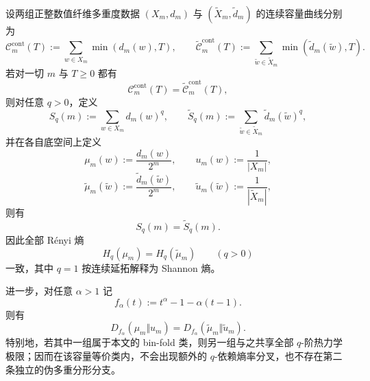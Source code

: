 \begin{theorem}[容量等价类的热力学刚性]\label{thm:conclusion-capacity-equivalence-thermodynamic-rigidity}
设两组正整数值纤维多重度数据 \((X_m,d_m)\) 与 \((\widetilde X_m,\widetilde d_m)\) 的连续容量曲线分别为
\[
\mathcal C_m^{\mathrm{cont}}(T):=\sum_{w\in X_m}\min(d_m(w),T),
\qquad
\widetilde{\mathcal C}_m^{\mathrm{cont}}(T):=\sum_{\widetilde w\in \widetilde X_m}\min(\widetilde d_m(\widetilde w),T).
\]
若对一切 \(m\) 与 \(T\ge 0\) 都有
\[
\mathcal C_m^{\mathrm{cont}}(T)=\widetilde{\mathcal C}_m^{\mathrm{cont}}(T),
\]
则对任意 \(q>0\)，定义
\[
S_q(m):=\sum_{w\in X_m}d_m(w)^q,
\qquad
\widetilde S_q(m):=\sum_{\widetilde w\in \widetilde X_m}\widetilde d_m(\widetilde w)^q,
\]
并在各自底空间上定义
\[
\mu_m(w):=\frac{d_m(w)}{2^m},
\qquad
u_m(w):=\frac{1}{|X_m|},
\]
\[
\widetilde\mu_m(\widetilde w):=\frac{\widetilde d_m(\widetilde w)}{2^m},
\qquad
\widetilde u_m(\widetilde w):=\frac{1}{|\widetilde X_m|},
\]
则有
\[
S_q(m)=\widetilde S_q(m).
\]
因此全部 Rényi 熵
\[
H_q(\mu_m)=H_q(\widetilde\mu_m)
\qquad(q>0)
\]
一致，其中 \(q=1\) 按连续延拓解释为 Shannon 熵。

进一步，对任意 \(\alpha>1\) 记
\[
f_\alpha(t):=t^\alpha-1-\alpha(t-1).
\]
则有
\[
D_{f_\alpha}(\mu_m\Vert u_m)
=
D_{f_\alpha}(\widetilde\mu_m\Vert \widetilde u_m).
\]
特别地，若其中一组属于本文的 bin-fold 类，则另一组与之共享全部 \(q\)-阶热力学极限；因而在该容量等价类内，不会出现额外的 \(q\)-依赖熵率分叉，也不存在第二条独立的伪多重分形分支。
\end{theorem}
